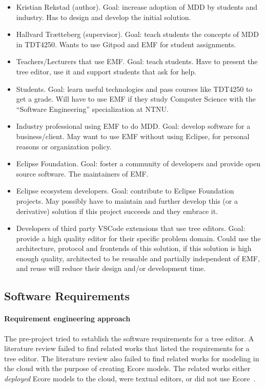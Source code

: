 \begin{itemize}
  \item Kristian Rekstad (author). Goal: increase adoption of \acrshort{MDD} by students and industry. Has to design and develop the initial solution.
  \item Hallvard Trætteberg (supervisor). Goal: teach students the concepts of \acrshort{MDD} in \gls{TDT4250}. Wants to use \gls{Gitpod} and \acrshort{EMF} for student assignments.
  \item Teachers/Lecturers that use \acrshort{EMF}. Goal: teach students. Have to present the tree editor, use it and support students that ask for help.
  \item Students. Goal: learn useful technologies and pass courses like \gls{TDT4250} to get a grade. Will have to use \acrshort{EMF} if they study Computer Science with the ``Software Engineering'' specialization at \acrshort{NTNU}.
  \item Industry professional using \acrshort{EMF} to do \acrshort{MDD}. Goal: develop software for a business/client. May want to use \acrshort{EMF} without using \gls{Eclipse}, for personal reasons or organization policy.
  \item Eclipse Foundation. Goal: foster a community of developers and provide open source software. The maintainers of \acrshort{EMF}.
  \item Eclipse ecosystem developers. Goal: contribute to Eclipse Foundation projects. May possibly have to maintain and further develop this (or a derivative) solution if this project succeeds and they embrace it.
  \item Developers of third party \gls{VSCode} extensions that use tree editors. Goal: provide a high quality editor for their specific problem domain. Could use the architecture, protocol and frontends of this solution, if this solution is high enough quality, architected to be reusable and partially independent of \acrshort{EMF}, and reuse will reduce their design and/or development time.
\end{itemize}

\subsection{Software Requirements}

\paragraph{Requirement engineering approach}
The pre-project tried to establish the software requirements for a tree editor.
A literature review failed to find related works that listed the requirements for a tree editor.
The literature review also failed to find related works for modeling in the cloud with the purpose of creating \gls{Ecore} models.
The related works either \textit{deployed} \gls{Ecore} models to the cloud, were textual editors, or did not use \gls{Ecore}~\cite[p.~3]{rekstadModelingEnvironmentCloud2020}.\\

